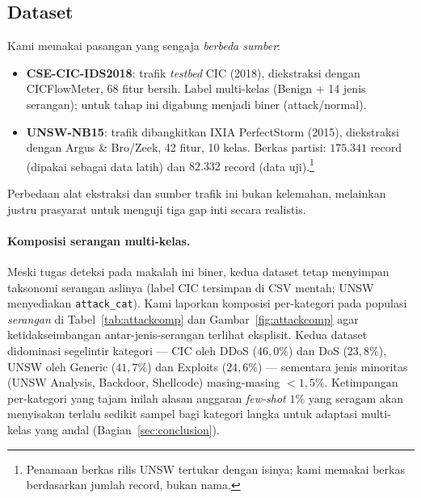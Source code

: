 \documentclass[11pt,a4paper]{article}
\begin{document}
\subsection{Dataset}
Kami memakai pasangan yang sengaja \emph{berbeda sumber}:
\begin{itemize}
  \item \textbf{CSE-CIC-IDS2018}: trafik \emph{testbed} CIC (2018), diekstraksi
  dengan CICFlowMeter, 68 fitur bersih. Label multi-kelas (Benign + 14 jenis
  serangan); untuk tahap ini digabung menjadi biner (attack/normal).
  \item \textbf{UNSW-NB15}: trafik dibangkitkan IXIA PerfectStorm (2015),
  diekstraksi dengan Argus \& Bro/Zeek, 42 fitur, 10 kelas. Berkas partisi:
  $175{.}341$ record (dipakai sebagai data latih) dan $82{.}332$ record (data
  uji).\footnote{Penamaan berkas rilis UNSW tertukar dengan isinya; kami memakai
  berkas berdasarkan jumlah record, bukan nama.}
\end{itemize}
Perbedaan alat ekstraksi dan sumber trafik ini bukan kelemahan, melainkan justru
prasyarat untuk menguji tiga gap inti secara realistis.

\paragraph{Komposisi serangan multi-kelas.} Meski tugas deteksi pada makalah ini
biner, kedua dataset tetap menyimpan taksonomi serangan aslinya (label CIC
tersimpan di CSV mentah; UNSW menyediakan \texttt{attack\_cat}). Kami laporkan
komposisi per-kategori pada populasi \emph{serangan} di Tabel~\ref{tab:attackcomp}
dan Gambar~\ref{fig:attackcomp} agar ketidakseimbangan antar-jenis-serangan
terlihat eksplisit. Kedua dataset didominasi segelintir kategori --- CIC oleh DDoS
($46{,}0\%$) dan DoS ($23{,}8\%$), UNSW oleh Generic ($41{,}7\%$) dan Exploits
($24{,}6\%$) --- sementara jenis minoritas (UNSW Analysis, Backdoor, Shellcode)
masing-masing $<1{,}5\%$. Ketimpangan per-kategori yang tajam inilah alasan
anggaran \emph{few-shot} $1\%$ yang seragam akan menyisakan terlalu sedikit sampel
bagi kategori langka untuk adaptasi multi-kelas yang andal
(Bagian~\ref{sec:conclusion}).
\end{document}
